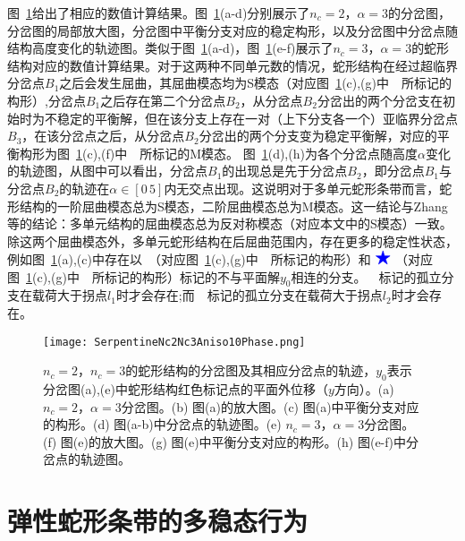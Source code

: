 图~\ref{fig:SerpentineNc2Nc3Aniso10Phase}给出了相应的数值计算结果。图~\ref{fig:SerpentineNc2Nc3Aniso10Phase}(a-d)分别展示了$n_c=2$，$\alpha=3$的分岔图，分岔图的局部放大图，分岔图中平衡分支对应的稳定构形，以及分岔图中分岔点随结构高度变化的轨迹图。类似于图~\ref{fig:SerpentineNc2Nc3Aniso10Phase}(a-d)，图~\ref{fig:SerpentineNc2Nc3Aniso10Phase}(e-f)展示了$n_c=3$，$\alpha=3$的蛇形结构对应的数值计算结果。对于这两种不同单元数的情况，蛇形结构在经过超临界分岔点$B_1$之后会发生屈曲，其屈曲模态均为S模态（对应图~\ref{fig:SerpentineNc2Nc3Aniso10Phase}(c),(g)中~\Bdiamond~所标记的构形）,分岔点$B_1$之后存在第二个分岔点$B_2$，从分岔点$B_2$分岔出的两个分岔支在初始时为不稳定的平衡解，但在该分支上存在一对（上下分支各一个）亚临界分岔点$B_3$，在该分岔点之后，从分岔点$B_2$分岔出的两个分支变为稳定平衡解，对应的平衡构形为图~\ref{fig:SerpentineNc2Nc3Aniso10Phase}(c),(f)中~\bluesquare~所标记的M模态。 图~\ref{fig:SerpentineNc2Nc3Aniso10Phase}(d),(h)为各个分岔点随高度$\alpha$变化的轨迹图，从图中可以看出，分岔点$B_1$的出现总是先于分岔点$B_2$，即分岔点$B_1$与分岔点$B_2$的轨迹在$\alpha \in \left[0 \, 5\right]$内无交点出现。这说明对于多单元蛇形条带而言，蛇形结构的一阶屈曲模态总为S模态，二阶屈曲模态总为M模态。这一结论与Zhang等\cite{zhang2013buckling}的结论：多单元结构的屈曲模态总为反对称模态（对应本文中的S模态）一致。除这两个屈曲模态外，多单元蛇形结构在后屈曲范围内，存在更多的稳定性状态，例如图~\ref{fig:SerpentineNc2Nc3Aniso10Phase}(a),(c)中存在以~\Btriangle（对应图~\ref{fig:SerpentineNc2Nc3Aniso10Phase}(c),(g)中~\Btriangle~所标记的构形）和$~\Bstarshape~$（对应图~\ref{fig:SerpentineNc2Nc3Aniso10Phase}(c),(g)中~\Bstarshape~所标记的构形）标记的不与平面解$y_0$相连的分支。~\Btriangle~标记的孤立分支在载荷大于拐点$l_1$时才会存在;而~\Bstarshape~标记的孤立分支在载荷大于拐点$l_2$时才会存在。

\begin{figure}[t]
	\centering
	\texttt{[image: SerpentineNc2Nc3Aniso10Phase.png]}
	\caption{$n_c=2$，$n_c=3$的蛇形结构的分岔图及其相应分岔点的轨迹，$y_0$表示分岔图(a),(e)中蛇形结构红色标记点的平面外位移（$y$方向）。(a) $n_c=2$，$\alpha=3$分岔图。(b) 图(a)的放大图。(c) 图(a)中平衡分支对应的构形。(d) 图(a-b)中分岔点的轨迹图。(e) $n_c=3$，$\alpha=3$分岔图。(f) 图(e)的放大图。(g) 图(e)中平衡分支对应的构形。(h) 图(e-f)中分岔点的轨迹图。}
	\label{fig:SerpentineNc2Nc3Aniso10Phase}
\end{figure}
\section{弹性蛇形条带的多稳态行为}
